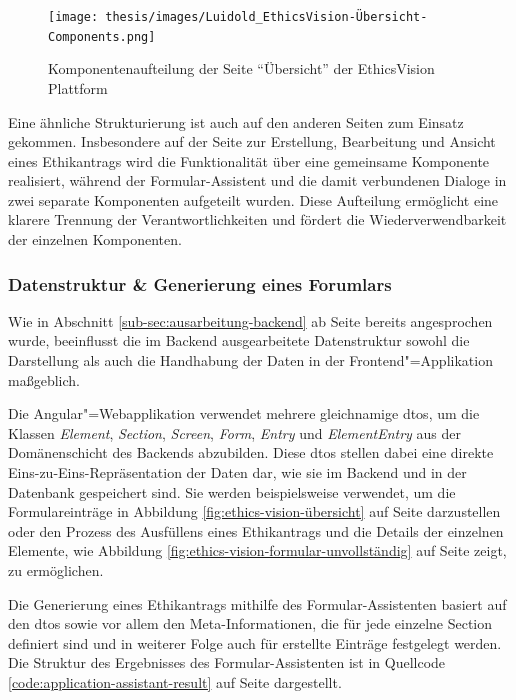 \documentclass[a4paper,12pt,twoside,numbers=noendperiod]{scrreprt}
\begin{document}
\begin{figure}[ht]
    \centering
    \texttt{[image: thesis/images/Luidold\_EthicsVision-Übersicht-Components.png]}
    \caption{Komponentenaufteilung der Seite \enquote{Übersicht} der EthicsVision Plattform}
    \label{fig:ethics-vision-übersicht-components}
\end{figure}

Eine ähnliche Strukturierung ist auch auf den anderen Seiten zum Einsatz gekommen. Insbesondere auf der Seite zur Erstellung, Bearbeitung und Ansicht eines Ethikantrags wird die Funktionalität über eine gemeinsame Komponente realisiert, während der Formular-Assistent und die damit verbundenen Dialoge in zwei separate Komponenten aufgeteilt wurden. Diese Aufteilung ermöglicht eine klarere Trennung der Verantwortlichkeiten und fördert die Wiederverwendbarkeit der einzelnen Komponenten.

\subsubsection*{Datenstruktur \& Generierung eines Forumlars}
\label{sub-sub-sec:angular-datenstruktur-generierung-formular}

Wie in Abschnitt \ref{sub-sec:ausarbeitung-backend} ab Seite \pageref{sub-sec:ausarbeitung-backend} bereits angesprochen wurde, beeinflusst die im Backend ausgearbeitete Datenstruktur sowohl die Darstellung als auch die Handhabung der Daten in der Frontend"=Applikation maßgeblich.

Die Angular"=Webapplikation verwendet mehrere gleichnamige \aclp{dto}, um die Klassen \textit{Element}, \textit{Section}, \textit{Screen}, \textit{Form}, \textit{Entry} und \textit{ElementEntry} aus der Domänenschicht des Backends abzubilden. Diese \ac{dto}s stellen dabei eine direkte Eins-zu-Eins-Repräsentation der Daten dar, wie sie im Backend und in der Datenbank gespeichert sind. Sie werden beispielsweise verwendet, um die Formulareinträge in Abbildung \ref{fig:ethics-vision-übersicht} auf Seite \pageref{fig:ethics-vision-übersicht} darzustellen oder den Prozess des Ausfüllens eines Ethikantrags und die Details der einzelnen Elemente, wie Abbildung \ref{fig:ethics-vision-formular-unvollständig} auf Seite \pageref{fig:ethics-vision-formular-unvollständig} zeigt, zu ermöglichen.

\medskip

Die Generierung eines Ethikantrags mithilfe des Formular-Assistenten basiert auf den \ac{dto}s sowie vor allem den Meta-Informationen, die für jede einzelne Section definiert sind und in weiterer Folge auch für erstellte Einträge festgelegt werden. Die Struktur des Ergebnisses des Formular-Assistenten ist in Quellcode \ref{code:application-assistant-result} auf Seite \pageref{code:application-assistant-result} dargestellt.
\end{document}
